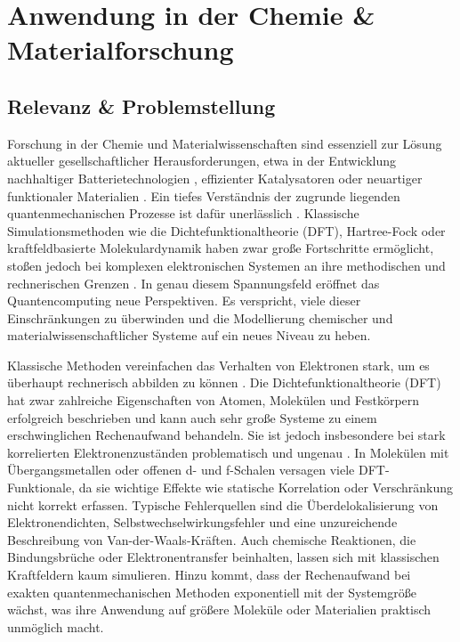 \chapter{Anwendung in der Chemie \& Materialforschung}
\label{trends} %



\section{Relevanz \& Problemstellung}
{Forschung in der Chemie und Materialwissenschaften sind essenziell zur Lösung aktueller gesellschaftlicher Herausforderungen, etwa in der Entwicklung nachhaltiger Batterietechnologien \cite{hanaor_computational_2024}, effizienter Katalysatoren oder neuartiger funktionaler Materialien \cite{daley_practical_2022}. Ein tiefes Verständnis der zugrunde liegenden quantenmechanischen Prozesse ist dafür unerlässlich \cite{bauer_quantum_2020}. Klassische Simulationsmethoden wie die Dichtefunktionaltheorie (DFT), Hartree-Fock oder kraftfeldbasierte Molekulardynamik haben zwar große Fortschritte ermöglicht, stoßen jedoch bei komplexen elektronischen Systemen an ihre methodischen und rechnerischen Grenzen \cite{daley_practical_2022}\cite{vermaStatusChallengesDensity2020}\cite{cao_quantum_2019}. In genau diesem Spannungsfeld eröffnet das Quantencomputing neue Perspektiven. Es verspricht, viele dieser Einschränkungen zu überwinden und die Modellierung chemischer und materialwissenschaftlicher Systeme auf ein neues Niveau zu heben.

Klassische Methoden vereinfachen das Verhalten von Elektronen stark, um es überhaupt rechnerisch abbilden zu können \cite{vermaStatusChallengesDensity2020}. Die Dichtefunktionaltheorie (DFT) hat zwar zahlreiche Eigenschaften von Atomen, Molekülen und Festkörpern erfolgreich beschrieben und kann auch sehr große Systeme zu einem erschwinglichen Rechenaufwand behandeln. Sie ist jedoch insbesondere bei stark korrelierten Elektronenzuständen problematisch und ungenau \cite{vermaStatusChallengesDensity2020}\cite{hanaor_computational_2024}. In Molekülen mit Übergangsmetallen oder offenen d- und f-Schalen versagen viele DFT-Funktionale, da sie wichtige Effekte wie statische Korrelation oder Verschränkung nicht korrekt erfassen. Typische Fehlerquellen sind die Überdelokalisierung von Elektronendichten, Selbstwechselwirkungsfehler und eine unzureichende Beschreibung von Van-der-Waals-Kräften. Auch chemische Reaktionen, die Bindungsbrüche oder Elektronentransfer beinhalten, lassen sich mit klassischen Kraftfeldern kaum simulieren. Hinzu kommt, dass der Rechenaufwand bei exakten quantenmechanischen Methoden exponentiell mit der Systemgröße wächst, was ihre Anwendung auf größere Moleküle oder Materialien praktisch unmöglich macht\cite{vermaStatusChallengesDensity2020}\cite{hanaor_computational_2024}\cite{cao_quantum_2019}.

}
